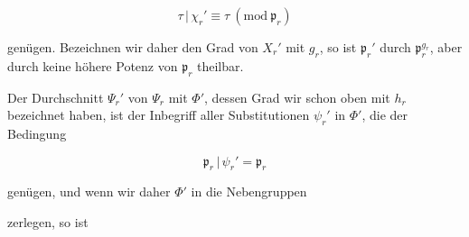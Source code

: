 \[
\tau\,|\,\chi_r' \equiv \tau \ (\mathrm{mod}\ \mathfrak{p}_r)
\]

genügen. Bezeichnen wir daher den Grad von $X_r'$ mit $g_r$, so ist
$\mathfrak{p}_r'$ durch $\mathfrak{p}_r^{g_r}$, aber durch keine höhere Potenz von $\mathfrak{p}_r$ theilbar.

Der Durchschnitt $\Psi_r'$ von $\Psi_r$ mit $\Phi'$, dessen Grad wir schon
oben mit $h_r$ bezeichnet haben, ist der Inbegriff aller Substitutionen
 $\psi_r'$ in $\Phi'$, die der Bedingung

\[
\mathfrak{p}_r\,|\,\psi_r' = \mathfrak{p}_r
\]

genügen, und wenn wir daher $\Phi'$ in die Nebengruppen


zerlegen, so ist

